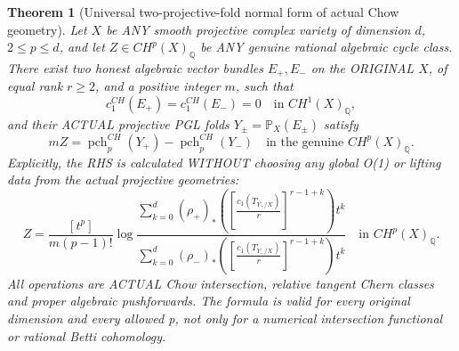 \documentclass[11pt]{article}
\newtheorem{theorem}{Theorem}
\begin{document}
\begin{theorem}[Universal two-projective-fold normal form of actual Chow geometry]
Let $X$ be ANY smooth projective complex variety of dimension $d$,
$2\le p\le d$, and let $Z\in CH^p(X)_{\mathbb Q}$ be ANY
genuine rational algebraic cycle class.
There exist two honest algebraic vector bundles
$E_+,E_-$ on the ORIGINAL $X$, of equal rank $r\ge2$,
and a positive integer $m$, such that
\[
 \boxed{
  c_1^{CH}(E_+)=c_1^{CH}(E_-)=0
        \quad\text{in }CH^1(X)_{\mathbb Q},
 }\tag{20}
\]
and their ACTUAL projective PGL folds
$Y_\pm=\mathbb P_X(E_\pm)$ satisfy
\[
 \boxed{
 m Z=
  \operatorname{pch}^{CH}_p(Y_+)
   -\operatorname{pch}^{CH}_p(Y_-)
   \quad\text{in the genuine }CH^p(X)_{\mathbb Q}.
 }\tag{21}
\]
Explicitly, the RHS is calculated WITHOUT choosing any
global O(1) or lifting data from the actual projective
geometries:
\[
 \boxed{
 Z=\frac{[t^p]}{m(p-1)!}
 \log\frac{
   \displaystyle\sum_{k=0}^{d}
   (\rho_+)_*\left(
   \left[\frac{c_1(T_{Y_+/X})}{r}\right]^{r-1+k}
   \right)t^k
 }{
   \displaystyle\sum_{k=0}^{d}
   (\rho_-)_*\left(
   \left[\frac{c_1(T_{Y_-/X})}{r}\right]^{r-1+k}
   \right)t^k
 }
 \quad\text{in } CH^p(X)_{\mathbb Q}.
 }\tag{22}
\]
All operations are ACTUAL Chow intersection, relative tangent
Chern classes and proper algebraic pushforwards.
The formula is valid for every original dimension and
every allowed p, not only for a numerical intersection
functional or rational Betti cohomology.
\end{theorem}
\end{document}
